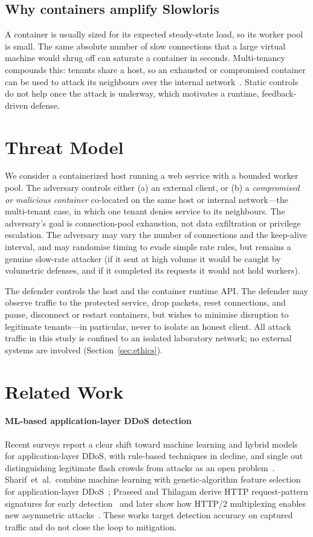 \documentclass[conference]{IEEEtran}
\begin{document}
\subsection{Why containers amplify Slowloris}
A container is usually sized for its expected steady-state load, so its worker
pool is small. The same absolute number of slow connections that a large virtual
machine would shrug off can saturate a container in seconds. Multi-tenancy
compounds this: tenants share a host, so an exhausted or compromised container
can be used to attack its neighbours over the internal
network~\cite{tripathi2021appdos}. Static controls do not help once the attack is
underway, which motivates a runtime, feedback-driven defense.

\section{Threat Model}
We consider a containerized host running a web service with a bounded worker
pool. The adversary controls either (a) an external client, or (b) a
\emph{compromised or malicious container} co-located on the same host or internal
network---the multi-tenant case, in which one tenant denies service to its
neighbours. The adversary's goal is connection-pool exhaustion, not data
exfiltration or privilege escalation. The adversary may vary the number of
connections and the keep-alive interval, and may randomise timing to evade
simple rate rules, but remains a genuine slow-rate attacker (if it sent at high
volume it would be caught by volumetric defenses, and if it completed its
requests it would not hold workers).

The defender controls the host and the container runtime API. The defender may
observe traffic to the protected service, drop packets, reset connections, and
pause, disconnect or restart containers, but wishes to minimise disruption to
legitimate tenants---in particular, never to isolate an honest client. All attack
traffic in this study is confined to an isolated laboratory network; no external
systems are involved (Section~\ref{sec:ethics}).

\section{Related Work}
\paragraph{ML-based application-layer DDoS detection}
Recent surveys report a clear shift toward machine learning and hybrid models for
application-layer DDoS, with rule-based techniques in decline, and single out
distinguishing legitimate flash crowds from attacks as an open
problem~\cite{deressu2026survey,praseed2019survey,tripathi2021appdos}.
Sharif~et~al.\ combine machine learning with genetic-algorithm feature selection
for application-layer DDoS~\cite{sharif2023genetic}; Praseed and Thilagam derive
HTTP request-pattern signatures for early
detection~\cite{praseed2022http} and later show how HTTP/2 multiplexing enables
new asymmetric attacks~\cite{praseed2020http2}. These works target detection
accuracy on captured traffic and do not close the loop to mitigation.
\end{document}

